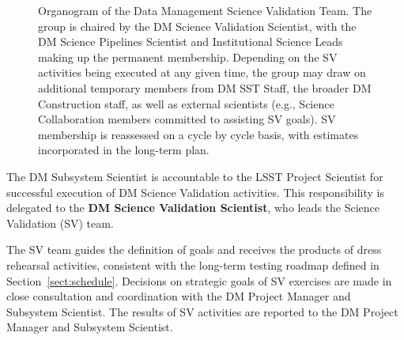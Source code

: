 \begin{figure}
\centering
{}
\caption{Organogram of the Data Management Science Validation Team.
The group is chaired by the DM Science Validation Scientist,
with the DM Science Pipelines Scientist and Institutional Science Leads making up
the permanent membership. Depending on the SV activities being executed at any
given time, the group may draw on additional temporary members from DM SST Staff,
the broader DM Construction staff, as well as external scientists (e.g.,
Science Collaboration members committed to assisting SV goals). SV membership
is reassessed on a cycle by cycle basis, with estimates incorporated in the
long-term plan.
\label{fig:DMsvg}}
\end{figure}

The DM Subsystem Scientist is accountable to the LSST Project Scientist for
successful execution of DM Science Validation activities.  This
responsibility is delegated to the \textbf{DM Science Validation Scientist},
who leads the Science Validation (SV) team.

The SV team guides the definition of goals and receives the products of
dress rehearsal activities, consistent with the long-term testing roadmap
defined in Section~\ref{sect:schedule}.  Decisions on strategic goals of SV exercises are made
in close consultation and coordination with the DM Project Manager and
Subsystem Scientist.  The results of SV activities are reported to the DM
Project Manager and Subsystem Scientist.

